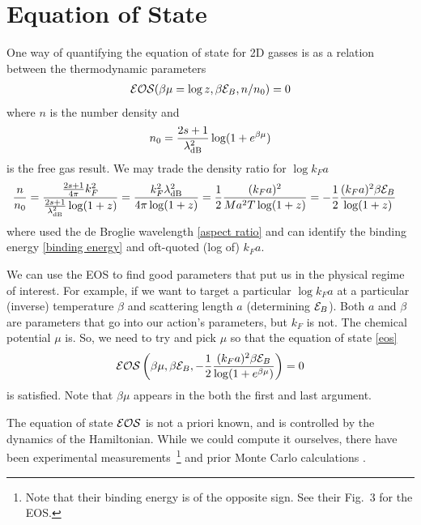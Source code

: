 \section{Equation of State}\label{sec:eos}

One way of quantifying the equation of state for 2D gasses is as a relation between the thermodynamic parameters
\begin{align}
    \mathcal{E}\mathcal{O}\mathcal{S}(\beta \mu = \log z, \beta \mathcal{E}_B, n/n_0) = 0
    \label{eq:eos}
\end{align}
where $n$ is the number density and 
\begin{align}
    n_0 = \frac{2s+1}{\lambda_{\text{dB}}^2} \log(1+e^{\beta\mu})
\end{align} is the free gas result.
We may trade the density ratio for $\log k_F a$
\begin{align}
    \frac{n}{n_0}
    &=
    \frac{\frac{2s+1}{4\pi} k_F^2}{\frac{2s+1}{\lambda_{\text{dB}}^2} \log(1+z)}
    =
    \frac{ k_F^2 \lambda_{\text{dB}}^2 }{4\pi \log(1+z)}
    =
    \frac{1}{2} \frac{ (k_Fa)^2 }{ Ma^2 T \log(1+z)}
    =
    -\frac{1}{2} \frac{(k_F a)^2 \beta\mathcal{E}_B }{\log(1+z)}
\end{align}
where used the de Broglie wavelength \eqref{aspect ratio} and can identify the binding energy \eqref{binding energy} and oft-quoted (log of) $k_F a$.

We can use the EOS to find good parameters that put us in the physical regime of interest.
For example, if we want to target a particular $\log k_F a$ at a particular (inverse) temperature $\beta$ and scattering length $a$ (determining $\mathcal{E}_B$).
Both $a$ and $\beta$ are parameters that go into our action's parameters, but $k_F$ is not.
The chemical potential $\mu$ is.
So, we need to try and pick $\mu$ so that the equation of state \eqref{eos}
\begin{align}
    \mathcal{E}\mathcal{O}\mathcal{S}\left(\beta \mu, \beta \mathcal{E}_B, - \frac{1}{2} \frac{ (k_Fa)^2 \beta \mathcal{E}_B}{ \log(1+e^{\beta \mu}) } \right) = 0
\end{align}
is satisfied.
Note that $\beta\mu$ appears in the both the first and last argument.

The equation of state $\mathcal{E}\mathcal{O}\mathcal{S}$ is not a priori known, and is controlled by the dynamics of the Hamiltonian.
While we could compute it ourselves, there have been experimental measurements~\cite{PhysRevLett.116.045303}\footnote{Note that their binding energy is of the opposite sign.  See their Fig.~3 for the EOS.} and prior Monte Carlo calculations \cite{Anderson:2015uqa}.

